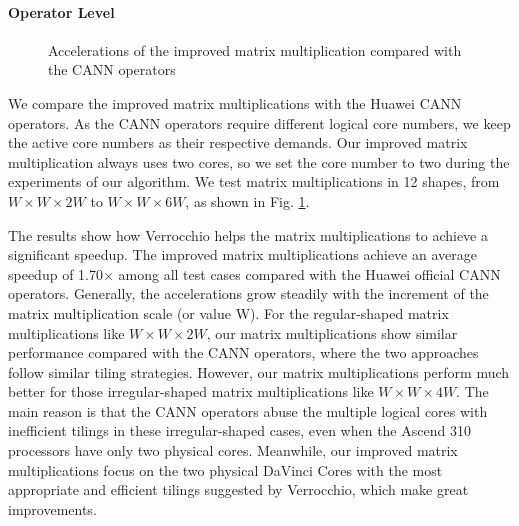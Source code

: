 \paragraph{Operator Level}

\begin{figure}[tbp]
\caption{Accelerations of the improved matrix multiplication compared with the CANN operators}
\label{fig:eva}
\end{figure}

We compare the improved matrix multiplications with the Huawei CANN operators. As the CANN operators require different logical core numbers, we keep the active core numbers as their respective demands. Our improved matrix multiplication always uses two cores, so we set the core number to two during the experiments of our algorithm. We test matrix multiplications in 12 shapes, from $W \times W \times 2W$ to $W \times W \times 6W$, as shown in Fig. \ref{fig:eva}.

The results show how Verrocchio helps the matrix multiplications to achieve a significant speedup. The improved matrix multiplications achieve an average speedup of 1.70$\times$ among all test cases compared with the Huawei official CANN operators. Generally, the accelerations grow steadily with the increment of the matrix multiplication scale (or value W). For the regular-shaped matrix multiplications like $W \times W \times 2W$, our matrix multiplications show similar performance compared with the CANN operators, where the two approaches follow similar tiling strategies. However, our matrix multiplications perform much better for those irregular-shaped matrix multiplications like $W \times W \times 4W$. The main reason is that the CANN operators abuse the multiple logical cores with inefficient tilings in these irregular-shaped cases, even when the Ascend 310 processors have only two physical cores. Meanwhile, our improved matrix multiplications focus on the two physical DaVinci Cores with the most appropriate and efficient tilings suggested by Verrocchio, which make great improvements.


